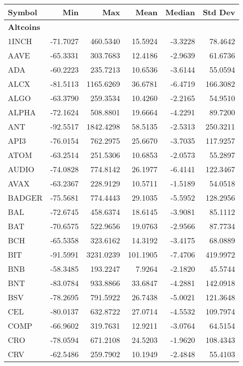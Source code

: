 \begin{table}[ht]
\centering
\scriptsize
\setlength{\tabcolsep}{4pt}
\begin{tabular}{lrrrrr}
\toprule
Symbol & Min & Max & Mean & Median & Std Dev \\
\midrule
\multicolumn{6}{l}{\textbf{Altcoins}} \\
1INCH & -71.7027 & 460.5340 & 15.5924 & -3.3228 & 78.4642 \\
AAVE & -65.3331 & 303.7683 & 12.4186 & -2.9639 & 61.6736 \\
ADA & -60.2223 & 235.7213 & 10.6536 & -3.6144 & 55.0594 \\
ALCX & -81.5113 & 1165.6269 & 36.6781 & -6.4719 & 166.3082 \\
ALGO & -63.3790 & 259.3534 & 10.4260 & -2.2165 & 54.9510 \\
ALPHA & -72.1624 & 508.8801 & 19.6664 & -4.2291 & 89.7200 \\
ANT & -92.5517 & 1842.4298 & 58.5135 & -2.5313 & 250.3211 \\
API3 & -76.0154 & 762.2975 & 25.6670 & -3.7035 & 117.9257 \\
ATOM & -63.2514 & 251.5306 & 10.6853 & -2.0573 & 55.2897 \\
AUDIO & -74.0828 & 774.8142 & 26.1977 & -6.4141 & 122.3467 \\
AVAX & -63.2367 & 228.9129 & 10.5711 & -1.5189 & 54.0518 \\
BADGER & -75.5681 & 774.4443 & 29.1035 & -5.5952 & 128.2956 \\
BAL & -72.6745 & 458.6374 & 18.6145 & -3.9081 & 85.1112 \\
BAT & -70.6575 & 522.9656 & 19.0763 & -2.9566 & 87.7734 \\
BCH & -65.5358 & 323.6162 & 14.3192 & -3.4175 & 68.0889 \\
BIT & -91.5991 & 3231.0239 & 101.1905 & -7.4706 & 419.9972 \\
BNB & -58.3485 & 193.2247 & 7.9264 & -2.1820 & 45.5744 \\
BNT & -83.0784 & 933.8866 & 33.6847 & -4.2881 & 142.0918 \\
BSV & -78.2695 & 791.5922 & 26.7438 & -5.0021 & 121.3648 \\
CEL & -80.0137 & 632.8722 & 27.0714 & -4.5532 & 109.7974 \\
COMP & -66.9602 & 319.7631 & 12.9211 & -3.0764 & 64.5154 \\
CRO & -78.0594 & 671.2108 & 24.5203 & -1.9620 & 108.4343 \\
CRV & -62.5486 & 259.7902 & 10.1949 & -2.4848 & 55.4103 \\

\end{tabular}
\end{table}
